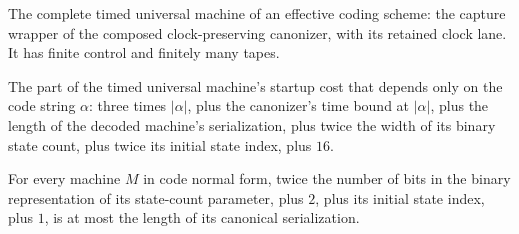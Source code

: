 \begin{definition}
\label{Turing.timedUniversalTM}
\leanok
{}
The complete timed universal machine of an effective coding scheme: the
capture wrapper of the composed clock-preserving canonizer, with its retained
clock lane.  It has finite control and finitely many tapes.
\end{definition}

\begin{definition}
\label{Turing.timedStartupBound}
\leanok
{}
The part of the timed universal machine's startup cost that depends only on
the code string $\alpha$: three times $|\alpha|$, plus the canonizer's time
bound at $|\alpha|$, plus the length of the decoded machine's serialization,
plus twice the width of its binary state count, plus twice its initial state
index, plus $16$.
\end{definition}

\begin{lemma}
\label{Turing.timed_header_bound}
\leanok
{}
For every machine $M$ in code normal form, twice the number of bits in the binary
representation of its state-count parameter, plus $2$, plus its initial state index,
plus $1$, is at most the length of its canonical serialization.
\end{lemma}


